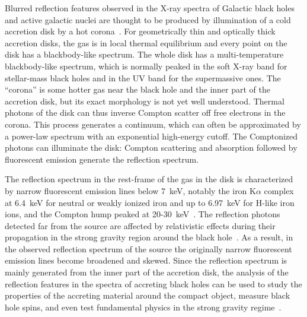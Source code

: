 \documentclass[twocolumn]{emulateapj}
\begin{document}
Blurred reflection features observed in the X-ray spectra of Galactic black holes and active galactic nuclei are thought to be produced by illumination of a cold accretion disk by a hot corona~\citep{1989MNRAS.238..729F,2003PhR...377..389R,2013Natur.494..449R,2020arXiv201104792B}. For geometrically thin and optically thick accretion disks, the gas is in local thermal equilibrium and every point on the disk has a blackbody-like spectrum. The whole disk has a multi-temperature blackbody-like spectrum, which is normally peaked in the soft X-ray band for stellar-mass black holes and in the UV band for the supermassive ones. The ``corona'' is some hotter gas near the black hole and the inner part of the accretion disk, but its exact morphology is not yet well understood. Thermal photons of the disk can thus inverse Compton scatter off free electrons in the corona. This process generates a continuum, which can often be approximated by a power-law spectrum with an exponential high-energy cutoff. The Comptonized photons can illuminate the disk: Compton scattering and absorption followed by fluorescent emission generate the reflection spectrum. 


The reflection spectrum in the rest-frame of the gas in the disk is characterized by narrow fluorescent emission lines below 7~keV, notably the iron K$\alpha$ complex at 6.4~keV for neutral or weakly ionized iron and up to 6.97~keV for H-like iron ions, and the Compton hump peaked at 20-30~keV~\citep{2005MNRAS.358..211R,2010ApJ...718..695G}. The reflection photons detected far from the source are affected by relativistic effects during their propagation in the strong gravity region around the black hole~\citep{1989MNRAS.238..729F,1991ApJ...376...90L,2010MNRAS.409.1534D,2017bhlt.book.....B}. As a result, in the observed reflection spectrum of the source the originally narrow fluorescent emission lines become broadened and skewed. Since the reflection spectrum is mainly generated from the inner part of the accretion disk, the analysis of the reflection features in the spectra of accreting black holes can be used to study the properties of the accreting material around the compact object, measure black hole spins, and even test fundamental physics in the strong gravity regime~\citep{2013mams.book.....B,2014SSRv..183..277R,2017RvMP...89b5001B,2020arXiv201104792B}. 
\end{document}
